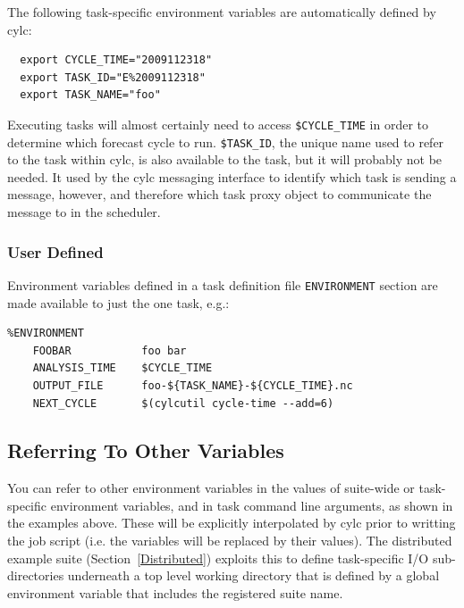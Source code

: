 \documentclass[11pt,a4paper]{article}
\begin{document}
The following task-specific environment variables are automatically
defined by cylc:

\begin{lstlisting}
  export CYCLE_TIME="2009112318"
  export TASK_ID="E%2009112318"
  export TASK_NAME="foo"
\end{lstlisting}

Executing tasks will almost certainly need to access
\lstinline=$CYCLE_TIME= in order to determine which forecast cycle to
run. \lstinline=$TASK_ID=, the unique name used to refer to the task
within cylc, is also available to the task, but it will probably not be
needed. It used by the cylc messaging interface to identify which task
is sending a message, however, and therefore which task proxy object to
communicate the message to in the scheduler.

\subsubsection{User Defined}
\lstset{language=cylctaskdef}

Environment variables defined in a task definition file
\lstinline=ENVIRONMENT= section are made available
to just the one task, e.g.:

\begin{lstlisting}
%ENVIRONMENT
    FOOBAR           foo bar
    ANALYSIS_TIME    $CYCLE_TIME
    OUTPUT_FILE      foo-${TASK_NAME}-${CYCLE_TIME}.nc
    NEXT_CYCLE       $(cylcutil cycle-time --add=6)
\end{lstlisting}

\lstset{language=bash}

\subsection{Referring To Other Variables}
\label{ReferringToOtherVariables}

\lstset{language=bash}

You can refer to other environment variables in the values of
suite-wide or task-specific environment variables, and in task command
line arguments, as shown in the examples above. These will be explicitly
interpolated by cylc prior to writting the job script (i.e.
the variables will be replaced by their values).  The distributed example
suite (Section~\ref{Distributed}) exploits this to define task-specific
I/O sub-directories underneath a top level working directory that is
defined by a global environment variable that includes the registered
suite name.
\end{document}
